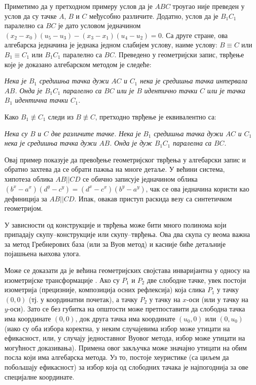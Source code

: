 Приметимо да у претходном примеру услов да је $ABC$ троугао није
преведен у услов да су тачке $A$, $B$ и $C$ међусобно
различите. Додатно, услов да је $B_1C_1$ паралелно са $BC$ је дато
условом једначином $(x_2 - x_0)(u_5 - u_3) - (x_3 - x_1)(u_4 - u_2) =
0$. Са друге стране, ова алгебарска једначина је једнака једном
слабијем услову, наиме услову: $B \equiv C$ или $B_1 \equiv C_1$ или
$B_1C_1$ паралелно са $BC$. Преведено у геометријски запис, тврђење
које је доказано алгебарском методом је следеће:

{\em Нека је $B_1$ средишња тачка дужи $AC$ и $C_1$ нека је
  средишња тачка интервала $AB$. Онда је $B_1C_1$ паралелно са $BC$
  или је $B$ идентично тачки $C$ или је тачка $B_1$ идентична тачки
  $C_1$.}

Како $B_1 \not\equiv C_1$ следи из $B \not\equiv C$, претходно тврђење
је еквивалентно са:

{\em Нека су $B$ и $C$ две различите тачке. Нека је $B_1$ средишња
  тачка дужи $AC$ и $C_1$ нека је средишња тачка дужи $AB$. Онда је
  дуж $B_1C_1$ паралелна са $BC$.}

Овај пример показује да превођење геометријског тврђења у алгебарски
запис и обратно захтева да се обрати пажња на многе детаље. У већини
система, хипотеза облика $AB || CD$ се обично записује једначином
облика $(b^x - a^x )(d^y - c^y ) = (d^x - c^x )(b^y - a^y )$, чак се
ова једначина користи као дефиниција за $AB || CD$. Ипак, овакав
приступ раскида везу са синтетичком геометријом.

У зависности од конструкције и тврђења може бити много полинома који
припадају скупу--конструкције или скупу--тврђења. Ова два скупа су
веома важна за метод Гребнерових база (или за Вуов метод) и касније
биће детаљније појашњена њихова улога.

Може се доказати да је већина геометријских својстава инваријантна у
односу на изометријске трансформације \cite{wucoq, wlog}. Ако су $P_1$
и $P_2$ две слободне тачке, увек постоји изометрија (прецизније,
композиција осних рефлексија) која слика $P_1$ у тачку $(0, 0)$ (тј. у
координатни почетак), а тачку $P_2$ у тачку на $x$-оси (или у тачку на
$y$-оси). Зато се без губитка на општости може претпоставити да
слободна тачка има координате $(0, 0)$, док друга тачка има координате
$(u_0, 0)$ или $(0, u_0)$ (иако су оба избора коректна, у неким
случајевима избор може утицати на ефикасност, или, у случају
једноставног Вуовог метода, избор може утицати на могућност
доказивања). Примена овог закључка може значајно утицати на обим посла
који има алгебарска метода. Уз то, постоје хеуристике (са циљем да
побољшају ефикасност) за избор која од слободних тачака је
најпогоднија за ове специјалне координате.
 
